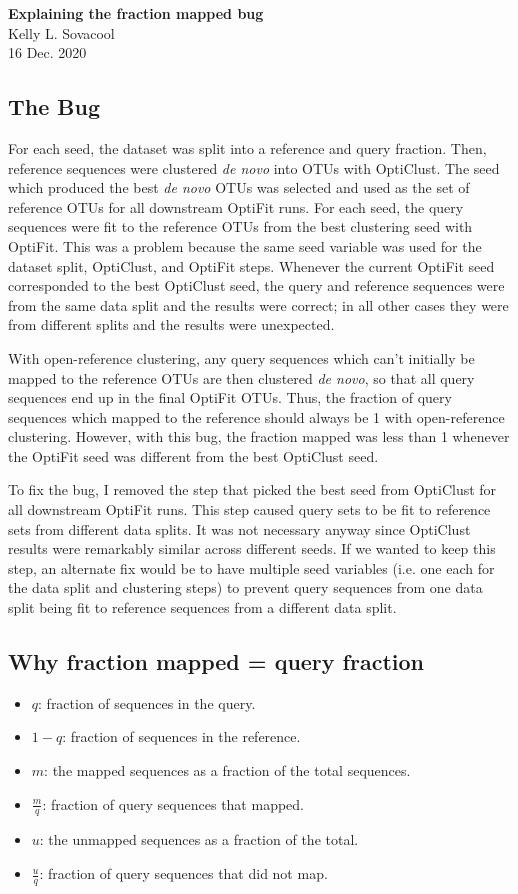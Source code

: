 \documentclass{article}
\begin{document}
\begin{flushleft}
\Large{\textbf{Explaining the fraction mapped bug}} \\
Kelly L. Sovacool \\
16 Dec. 2020
\end{flushleft}

\subsection*{The Bug}
For each seed, the dataset was split into a reference and query fraction.
Then, reference sequences were clustered \textit{de novo} into OTUs with OptiClust.
The seed which produced the best \textit{de novo} OTUs was selected and used as the set of reference OTUs for all downstream OptiFit runs.
For each seed, the query sequences were fit to the reference OTUs from the best clustering seed with OptiFit.
This was a problem because the same seed variable was used for the dataset split, OptiClust, and OptiFit steps.
Whenever the current OptiFit seed corresponded to the best OptiClust seed,
the query and reference sequences were from the same data split and the results were correct;
in all other cases they were from different splits and the results were unexpected.

With open-reference clustering, any query sequences which can't initially be mapped to the reference OTUs are then clustered \textit{de novo},
so that all query sequences end up in the final OptiFit OTUs.
Thus, the fraction of query sequences which mapped to the reference should always be 1 with open-reference clustering.
However, with this bug, the fraction mapped was less than 1 whenever the OptiFit seed was different from the best OptiClust seed.

To fix the bug, I removed the step that picked the best seed from OptiClust for all downstream OptiFit runs.
This step caused query sets to be fit to reference sets from different data splits.
It was not necessary anyway since OptiClust results were remarkably similar across different seeds.
If we wanted to keep this step, an alternate fix would be to have multiple seed variables
(i.e. one each for the data split and clustering steps)
to prevent query sequences from one data split being fit to reference sequences from a different data split.

\subsection*{Why fraction mapped = query fraction}
\begin{itemize}
    \item $q$: fraction of sequences in the query.
    \item $1 - q$: fraction of sequences in the reference.
    \item $m$: the mapped sequences as a fraction of the total sequences.
    \item $\frac{m}{q}$: fraction of query sequences that mapped.
    \item $u$: the unmapped sequences as a fraction of the total.
    \item $\frac{u}{q}$: fraction of query sequences that did not map.
\end{itemize}
\end{document}
